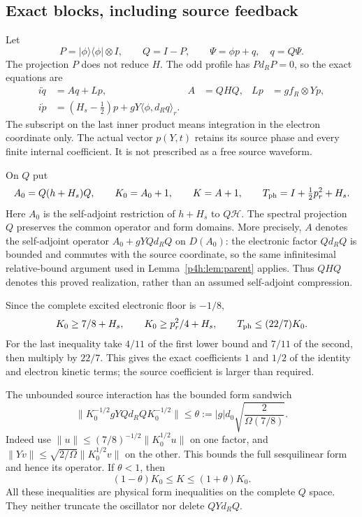 \documentclass[11pt]{article}
\numberwithin{equation}{section}
\theoremstyle{definition}
\theoremstyle{remark}
\begin{document}
\subsection{Exact blocks, including source feedback}

Let
\[
 P=|\phi\rangle\langle\phi|\otimes I,\qquad Q=I-P,\qquad
 \Psi=\phi p+q,\quad q=Q\Psi .
\]
The projection $P$ does not reduce $H$.
The odd profile has $Pd_RP=0$, so the exact equations are
\begin{align}
 i\dot q&=Aq+Lp,& A&=QHQ,& Lp&=gf_R\otimes Yp,
 \label{p4h:eq:qblock}\\
 i\dot p&=(H_s-\tfrac12)p+
                        gY\langle\phi,d_Rq\rangle_r .
 \label{p4h:eq:pfeedback}
\end{align}
The subscript on the last inner product means integration in
the electron coordinate only. The actual vector $p(Y,t)$
retains its source phase and every finite internal coefficient.
It is not prescribed as a free source waveform.

On $Q$ put
\begin{equation}\label{p4h:eq:weights}
 A_0=Q(h+H_s)Q,\qquad K_0=A_0+1,\qquad K=A+1,\qquad
 T_{\rm ph}=I+\tfrac12p_r^2+H_s .
\end{equation}
Here $A_0$ is the self-adjoint restriction of $h+H_s$ to
$Q\mathcal H$. The spectral projection $Q$ preserves the common
operator and form domains. More precisely, $A$ denotes the
self-adjoint operator $A_0+gYQd_RQ$ on $D(A_0)$: the electronic
factor $Qd_RQ$ is bounded and commutes with the source coordinate,
so the same infinitesimal relative-bound argument used in
Lemma~\ref{p4h:lem:parent} applies. Thus $QHQ$ denotes this proved
realization, rather than an assumed self-adjoint compression.

Since the complete excited electronic floor is $-1/8$,
\begin{equation}\label{p4h:eq:K0bounds}
 K_0\geq7/8+H_s,\qquad K_0\geq p_r^2/4+H_s,\qquad
                         T_{\rm ph}\leq(22/7)K_0 .
\end{equation}
For the last inequality take $4/11$ of the first lower
bound and $7/11$ of the second, then multiply by $22/7$.
This gives the exact coefficients $1$ and $1/2$ of the
identity and electron kinetic terms; the source coefficient
is larger than required.

The unbounded source interaction has the bounded form sandwich
\begin{equation}\label{p4h:eq:theta}
 \|K_0^{-1/2}gYQd_RQK_0^{-1/2}\|
 \leq\theta:=|g|d_0\sqrt{\frac{2}{\Omega(7/8)}}.
\end{equation}
Indeed use $\|u\|\leq(7/8)^{-1/2}\|K_0^{1/2}u\|$ on
one factor, and
$\|Yv\|\leq\sqrt{2/\Omega}\|K_0^{1/2}v\|$ on the other.
This bounds the full sesquilinear form and hence its operator.
If $\theta<1$, then
\begin{equation}\label{p4h:eq:Kcomparison}
 (1-\theta)K_0\leq K\leq(1+\theta)K_0 .
\end{equation}
All these inequalities are physical form inequalities on the
complete $Q$ space. They neither truncate the oscillator nor
delete $QYd_RQ$.
\end{document}
